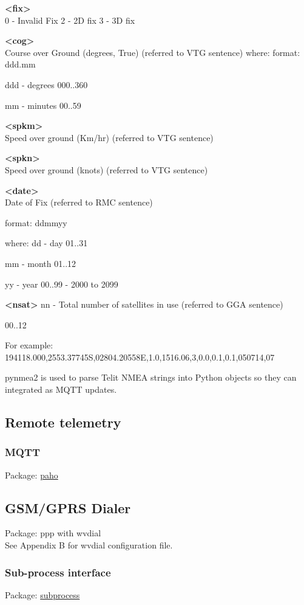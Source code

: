 \textbf{<fix>} \\
0 - Invalid Fix
2 - 2D fix
3 - 3D fix

\textbf{<cog>} \\
Course over Ground (degrees, True) (referred to VTG sentence) where:
format:
ddd.mm

ddd - degrees		 	 	 		
000..360

mm - minutes						
00..59

\textbf{<spkm>} \\
Speed over ground (Km/hr) (referred to VTG sentence)

\textbf{<spkn>} \\
Speed over ground (knots) (referred to VTG sentence)

\textbf{<date>} \\
Date of Fix (referred to RMC sentence)

format:
ddmmyy 
						
where:
dd - day					
01..31

mm - month					
01..12

yy - year						
00..99 - 2000 to 2099

\textbf{<nsat>}
nn - Total number of satellites in use (referred to GGA sentence)
						
00..12

For example:
194118.000,2553.37745S,02804.20558E,1.0,1516.06,3,0.0,0.1,0.1,050714,07

pynmea2 is used to parse Telit NMEA strings into Python objects so they can integrated as MQTT updates.

\subsection{Remote telemetry}

\subsubsection{MQTT}
Package:	\href{https://eclipse.org/paho/clients/python/}{paho}\\

\subsection{GSM/GPRS Dialer}
Package: 	ppp with wvdial\\
See Appendix B for wvdial configuration file.

\subsubsection{Sub-process interface}
Package:	\href{https://docs.python.org/2/library/subprocess.html}{subprocess}\\

